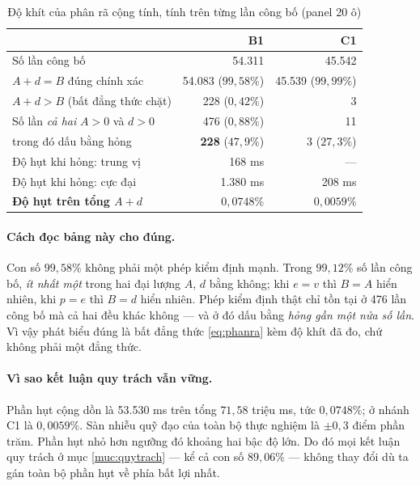 \begin{table}[htbp]
\centering
\caption{Độ khít của phân rã cộng tính, tính trên từng lần công bố (panel 20 ô)}
\label{bang:khit-tung-lan}
\small
\begin{tabular}{@{}lrr@{}}
\toprule
& \textbf{B1} & \textbf{C1}\\
\midrule
Số lần công bố & 54.311 & 45.542\\
$A + d = B$ đúng chính xác & 54.083 \;($99{,}58\%$) & 45.539 \;($99{,}99\%$)\\
$A + d > B$ (bất đẳng thức chặt) & 228 \;($0{,}42\%$) & 3\\
\midrule
Số lần \emph{cả hai} $A>0$ và $d>0$ & 476 \;($0{,}88\%$) & 11\\
\quad trong đó dấu bằng hỏng & \textbf{228} \;(\textbf{$47{,}9\%$}) & 3 \;($27{,}3\%$)\\
\midrule
Độ hụt khi hỏng: trung vị & 168 ms & ---\\
Độ hụt khi hỏng: cực đại & 1.380 ms & 208 ms\\
\textbf{Độ hụt trên tổng $A+d$} & \textbf{$0{,}0748\%$} & \textbf{$0{,}0059\%$}\\
\bottomrule
\end{tabular}
\end{table}

\paragraph{Cách đọc bảng này cho đúng.} Con số $99{,}58\%$ không phải một phép kiểm định mạnh.
Trong $99{,}12\%$ số lần công bố, \emph{ít nhất một} trong hai đại lượng $A$, $d$ bằng không;
khi $e = v$ thì $B = A$ hiển nhiên, khi $p = e$ thì $B = d$ hiển nhiên. Phép kiểm định thật chỉ
tồn tại ở 476 lần công bố mà cả hai đều khác không --- và ở đó dấu bằng \emph{hỏng gần một nửa
số lần}. Vì vậy phát biểu đúng là bất đẳng thức \eqref{eq:phanra} kèm độ khít đã đo, chứ không
phải một đẳng thức.

\paragraph{Vì sao kết luận quy trách vẫn vững.} Phần hụt cộng dồn là 53.530 ms trên tổng
$71{,}58$ triệu ms, tức $0{,}0748\%$; ở nhánh C1 là $0{,}0059\%$. Sàn nhiễu quỹ đạo của toàn bộ
thực nghiệm là $\pm 0{,}3$ điểm phần trăm. Phần hụt nhỏ hơn ngưỡng đó khoảng hai bậc độ lớn. Do
đó mọi kết luận quy trách ở mục \ref{muc:quytrach} --- kể cả con số $89{,}06\%$ --- không thay
đổi dù ta gán toàn bộ phần hụt về phía bất lợi nhất.

